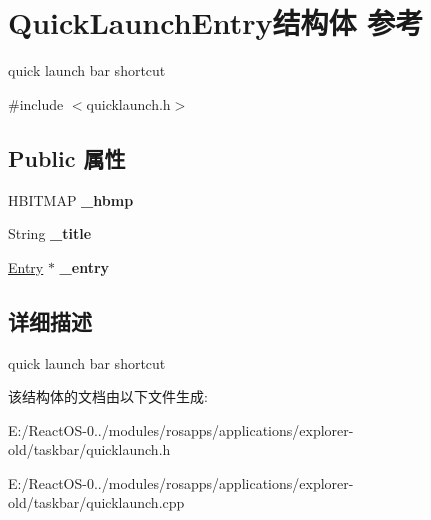 \hypertarget{struct_quick_launch_entry}{}\section{Quick\+Launch\+Entry结构体 参考}
\label{struct_quick_launch_entry}


quick launch bar shortcut  




{\ttfamily \#include $<$quicklaunch.\+h$>$}

\subsection*{Public 属性}
\begin{DoxyCompactItemize}
\item 
\mbox{\label{struct_quick_launch_entry_adec8c9aa61fcb22a266ab2f1329d8f37}} 
H\+B\+I\+T\+M\+AP {\bfseries \+\_\+hbmp}
\item 
\mbox{\label{struct_quick_launch_entry_a0dd4302915496b073e712ed9bd1c9441}} 
String {\bfseries \+\_\+title}
\item 
\mbox{\label{struct_quick_launch_entry_a71626d3be35f69e83e084dbee0d5817f}} 
\hyperlink{struct_entry}{Entry} $\ast$ {\bfseries \+\_\+entry}
\end{DoxyCompactItemize}


\subsection{详细描述}
quick launch bar shortcut 

该结构体的文档由以下文件生成\+:\begin{DoxyCompactItemize}
\item 
E\+:/\+React\+O\+S-\/0../modules/rosapps/applications/explorer-\/old/taskbar/quicklaunch.\+h\item 
E\+:/\+React\+O\+S-\/0../modules/rosapps/applications/explorer-\/old/taskbar/quicklaunch.\+cpp\end{DoxyCompactItemize}

